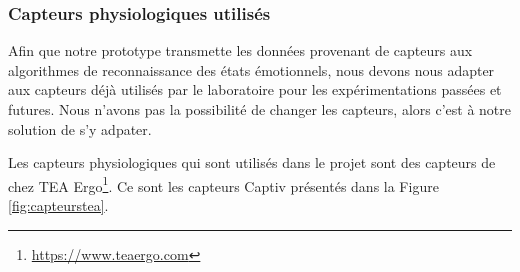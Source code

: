 \documentclass{article}
\begin{document}
		\subsubsection{Capteurs physiologiques utilisés}\label{sec:capteurs}
			Afin que notre prototype transmette les données provenant de capteurs aux algorithmes de reconnaissance des états émotionnels, nous devons nous adapter aux capteurs déjà utilisés par le laboratoire pour les expérimentations passées et futures.
			Nous n'avons pas la possibilité de changer les capteurs, alors c'est à notre solution de s'y adpater.\par
			Les capteurs physiologiques qui sont utilisés dans le projet sont des capteurs de chez TEA Ergo\footnote{\href{https://www.teaergo.com}{https://www.teaergo.com}}.
			Ce sont les capteurs Captiv présentés dans la Figure \ref{fig:capteurstea}.
\end{document}
